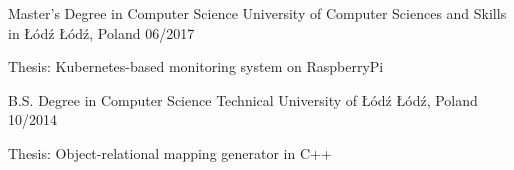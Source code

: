

\begin{cventries}

  \cventry
    {Master's Degree in Computer Science} %
    {University of Computer Sciences and Skills in Łódź} %
    {Łódź, Poland} %
    {06/2017} %
    {
      \begin{cvitems} %
        \item {Thesis: Kubernetes-based monitoring system on RaspberryPi}
      \end{cvitems}
    }

  \cventry
  {B.S. Degree in Computer Science} %
  {Technical University of Łódź} %
  {Łódź, Poland} %
  {10/2014} %
  {
  \begin{cvitems} %
    \item {Thesis: Object-relational mapping generator in C++}
  \end{cvitems}
  }

\end{cventries}
